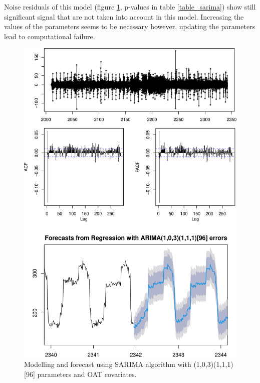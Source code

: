 Noise residuals of this model (figure \ref{figure_residuals_sarima}, p-values in table 
\ref{table_sarima}) show still significant signal that are not taken into account in this model. 
Increasing the values of the parameters seems to be necessary however, updating the parameters 
lead to computational failure.

\begin{figure}[!h]
\centering
 \includegraphics[scale=0.45]{figures/figure_residuals_sarima.png}
 \caption{Modelling and forecast using SARIMA algorithm with (1,0,3)(1,1,1)[96] parameters and OAT covariates.}
\label{figure_residuals_sarima}
\end{figure}

